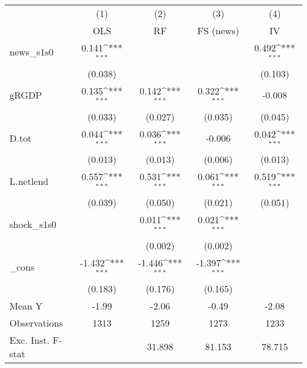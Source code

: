 {
\def\sym#1{\ifmmode^{#1}\else\(^{#1}\)\fi}
\begin{tabular}{l*{4}{c}}
\toprule
            &\multicolumn{1}{c}{(1)}&\multicolumn{1}{c}{(2)}&\multicolumn{1}{c}{(3)}&\multicolumn{1}{c}{(4)}\\
            &\multicolumn{1}{c}{OLS}&\multicolumn{1}{c}{RF}&\multicolumn{1}{c}{FS (news)}&\multicolumn{1}{c}{IV}\\
\midrule
news\_s1s0   &       0.141\sym{***}&                     &                     &       0.492\sym{***}\\
            &     (0.038)         &                     &                     &     (0.103)         \\
\addlinespace
gRGDP       &       0.135\sym{***}&       0.142\sym{***}&       0.322\sym{***}&      -0.008         \\
            &     (0.033)         &     (0.027)         &     (0.035)         &     (0.045)         \\
\addlinespace
D.tot       &       0.044\sym{***}&       0.036\sym{***}&      -0.006         &       0.042\sym{***}\\
            &     (0.013)         &     (0.013)         &     (0.006)         &     (0.013)         \\
\addlinespace
L.netlend   &       0.557\sym{***}&       0.531\sym{***}&       0.061\sym{***}&       0.519\sym{***}\\
            &     (0.039)         &     (0.050)         &     (0.021)         &     (0.051)         \\
\addlinespace
shock\_s1s0  &                     &       0.011\sym{***}&       0.021\sym{***}&                     \\
            &                     &     (0.002)         &     (0.002)         &                     \\
\addlinespace
\_cons      &      -1.432\sym{***}&      -1.446\sym{***}&      -1.397\sym{***}&                     \\
            &     (0.183)         &     (0.176)         &     (0.165)         &                     \\
\midrule
Mean Y      &       -1.99         &       -2.06         &       -0.49         &       -2.08         \\
Observations&        1313         &        1259         &        1273         &        1233         \\
Exc. Inst. F-stat&                     &      31.898         &      81.153         &      78.715         \\
\bottomrule
\end{tabular}
}
